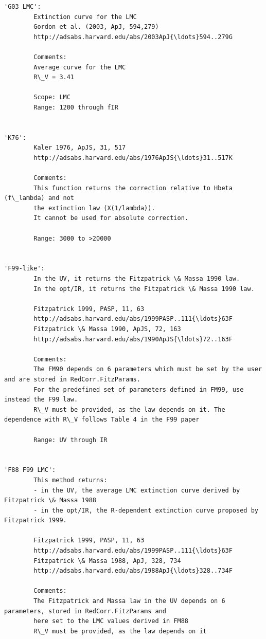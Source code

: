 \documentclass[11pt]{article}
\begin{document}
    \begin{Verbatim}[commandchars=\\\{\}]
'G03 LMC': 
        Extinction curve for the LMC
        Gordon et al. (2003, ApJ, 594,279)
        http://adsabs.harvard.edu/abs/2003ApJ{\ldots}594..279G
        
        Comments:
        Average curve for the LMC
        R\_V = 3.41

        Scope: LMC
        Range: 1200 through fIR   

        
'K76': 
        Kaler 1976, ApJS, 31, 517
        http://adsabs.harvard.edu/abs/1976ApJS{\ldots}31..517K
        
        Comments:
        This function returns the correction relative to Hbeta (f\_lambda) and not
        the extinction law (X(1/lambda)).
        It cannot be used for absolute correction.
        
        Range: 3000 to >20000
        
        
'F99-like': 
        In the UV, it returns the Fitzpatrick \& Massa 1990 law.
        In the opt/IR, it returns the Fitzpatrick \& Massa 1990 law. 
        
        Fitzpatrick 1999, PASP, 11, 63
        http://adsabs.harvard.edu/abs/1999PASP..111{\ldots}63F
        Fitzpatrick \& Massa 1990, ApJS, 72, 163
        http://adsabs.harvard.edu/abs/1990ApJS{\ldots}72..163F
        
        Comments:
        The FM90 depends on 6 parameters which must be set by the user and are stored in RedCorr.FitzParams.
        For the predefined set of parameters defined in FM99, use instead the F99 law.
        R\_V must be provided, as the law depends on it. The dependence with R\_V follows Table 4 in the F99 paper 

        Range: UV through IR
        
        
'F88 F99 LMC': 
        This method returns:
        - in the UV, the average LMC extinction curve derived by Fitzpatrick \& Massa 1988
        - in the opt/IR, the R-dependent extinction curve proposed by Fitzpatrick 1999.
        
        Fitzpatrick 1999, PASP, 11, 63
        http://adsabs.harvard.edu/abs/1999PASP..111{\ldots}63F
        Fitzpatrick \& Massa 1988, ApJ, 328, 734
        http://adsabs.harvard.edu/abs/1988ApJ{\ldots}328..734F
        
        Comments:
        The Fitzpatrick and Massa law in the UV depends on 6 parameters, stored in RedCorr.FitzParams and 
        here set to the LMC values derived in FM88
        R\_V must be provided, as the law depends on it
        

\end{Verbatim}
\end{document}
